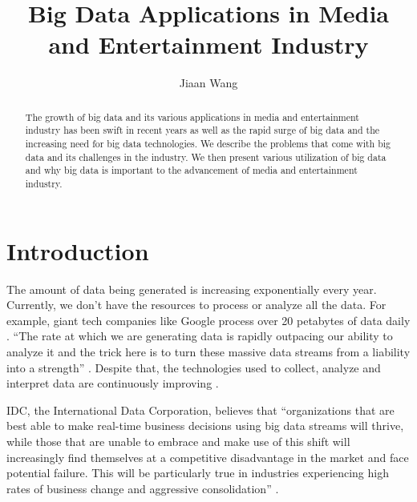 \documentclass[sigconf]{acmart}
\begin{document}
\title{Big Data Applications in Media and Entertainment Industry}


\author{Jiaan Wang}


\begin{abstract}

    The growth of big data and its various applications in media and entertainment 
    industry has been swift in recent years as well as the rapid surge of big data 
    and the increasing need for big data technologies. We describe the problems 
    that come with big data and its challenges in the industry. We then present 
    various utilization of big data and why big data is important to the advancement 
    of media and entertainment industry. 
    
\end{abstract}


\maketitle

\section{Introduction}

The amount of data being generated is increasing exponentially every year. Currently, we don't have the resources to process or analyze all the data. For example, giant tech companies like Google process over 20 petabytes of data daily \cite{Schlieski2012data}. ``The rate at which we are generating data is rapidly outpacing our ability to analyze it and the trick here is to turn these massive data streams from a liability into a strength'' \cite{Browning2015laptop}. Despite that, the technologies used to collect, analyze and interpret data are continuously improving \cite{Schlieski2012data}.

IDC, the International Data Corporation, believes that ``organizations that are best able to make real-time business decisions using big data streams will thrive, while those that are unable to embrace and make use of this shift will increasingly find themselves at a competitive disadvantage in the market and face potential failure. This will be particularly true in industries experiencing high rates of business change and aggressive consolidation'' \cite{Villars2011care}.
\end{document}
